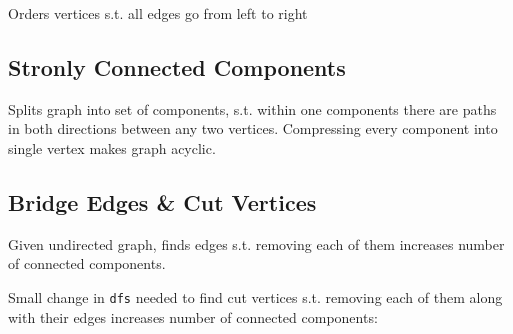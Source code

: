 Orders vertices s.t. all edges go from left to right

\subsection{Stronly Connected Components}

Splits graph into set of components, s.t. within one components there are paths in both directions between any two vertices. Compressing every component into single vertex makes graph acyclic. 

\subsection{Bridge Edges \& Cut Vertices}

Given undirected graph, finds edges s.t. removing each of them increases number of connected components. 

Small change in \verb|dfs| needed to find cut vertices s.t. removing each of them along with their edges increases number of connected components:


